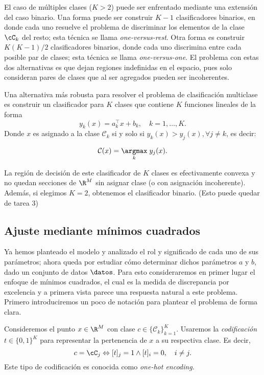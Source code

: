 El caso de múltiples clases ($K>2$) puede ser enfrentado mediante una extensión del caso binario. Una forma puede ser construir $K-1$ clasificadores binarios, en donde cada uno  resuelve el problema de discriminar los elementos de la  clase $\cC_k$ del resto; esta técnica se llama \emph{one-versus-rest}. Otra forma es construir $K(K-1)/2$ clasificadores binarios, donde cada uno discrimina entre cada posible par de clases; esta técnica se llama \emph{one-versus-one}. El problema con estas dos alternativas es que dejan  regiones indefinidas en el espacio, pues solo consideran pares de clases que  al ser agregados pueden ser incoherentes. 

Una alternativa más robusta para resolver el problema de clasificación multiclase es construir un clasificador para $K$ clases que contiene $K$ funciones lineales de la forma
\begin{equation}
	y_k(x) = a_k^\top x + b_k, \quad k=1,\ldots,K.
\end{equation}
Donde $x$ es asignado a la clase $\mathcal{C}_k$ si y solo si $y_k(x) > y_j(x), \forall j\neq k$, es decir:

\begin{equation}
	\mathcal{C}(x) = \underset{k}{\argmax}\hspace{1mm} y_j(x).
\end{equation}

La región de decisión de este clasificador de $K$ clases es efectivamente convexa y no  quedan secciones de $\R^M$ sin asignar clase (o con asignación incoherente). Además, si elegimos $K=2$, obtenemos el clasificador  binario. (Esto puede quedar de tarea 3)

\subsection{Ajuste mediante mínimos cuadrados}

Ya hemos planteado el modelo y analizado el rol  y significado de cada uno de sus parámetros; ahora queda por estudiar cómo determinar dichos parámetros $a$ y $b$, dado un conjunto de datos $\datos$. Para esto consideraremos en primer lugar el enfoque de mínimos cuadrados, el cual es la medida de discrepancia  por  excelencia  y a primera vista  parece una respuesta natural a este problema. Primero  introduciremos un poco de notación para plantear el problema de forma clara.

Consideremos el  punto $x\in\R^M$ con clase $c\in\{\mathcal{C}_k\}_{k=1}^K$. Usaremos la \emph{codificación} $t \in\{0,1\}^K$ para representar la pertenencia de $x$ a su respectiva clase. Es decir, 
\begin{equation}
	c = \cC_j \Leftrightarrow [t]_j=1 \wedge [t]_i=0, \quad i\neq j.
\end{equation}
Este tipo de codificación  es conocida como \emph{one-hot  encoding.}  

